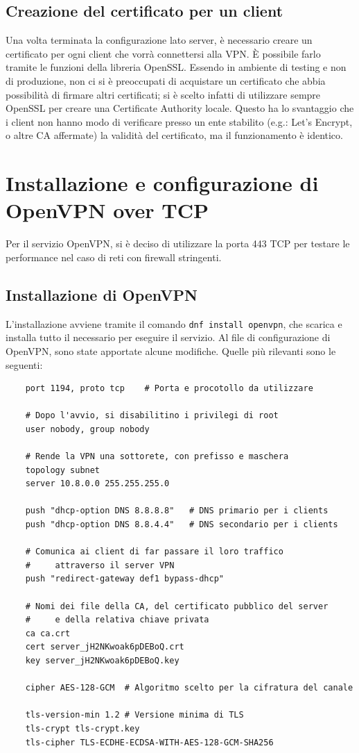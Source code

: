 \subsection{Creazione del certificato per un client}
Una volta terminata la configurazione lato server, è necessario creare un certificato per ogni client che vorrà connettersi alla VPN. È possibile farlo tramite le funzioni della libreria OpenSSL. Essendo in ambiente di testing e non di produzione, non ci si è preoccupati di acquistare un certificato che abbia possibilità di firmare altri certificati; si è scelto infatti di utilizzare sempre OpenSSL per creare una Certificate Authority locale. Questo ha lo svantaggio che i client non hanno modo di verificare presso un ente stabilito (e.g.: Let's Encrypt, o altre CA affermate) la validità del certificato, ma il funzionamento è identico.

\section{Installazione e configurazione di OpenVPN over TCP}
Per il servizio OpenVPN, si è deciso di utilizzare la porta 443 TCP per testare le performance nel caso di reti con firewall stringenti.

\subsection{Installazione di OpenVPN}
L'installazione avviene tramite il comando \texttt{dnf install openvpn}, che scarica e installa tutto il necessario per eseguire il servizio.
Al file di configurazione di OpenVPN, sono state apportate alcune modifiche. Quelle più rilevanti sono le seguenti:

\begin{verbatim}
    port 1194, proto tcp    # Porta e procotollo da utilizzare
    
    # Dopo l'avvio, si disabilitino i privilegi di root
    user nobody, group nobody   

    # Rende la VPN una sottorete, con prefisso e maschera
    topology subnet         
    server 10.8.0.0 255.255.255.0

    push "dhcp-option DNS 8.8.8.8"   # DNS primario per i clients
    push "dhcp-option DNS 8.8.4.4"   # DNS secondario per i clients

    # Comunica ai client di far passare il loro traffico 
    #     attraverso il server VPN
    push "redirect-gateway def1 bypass-dhcp"   

    # Nomi dei file della CA, del certificato pubblico del server 
    #     e della relativa chiave privata
    ca ca.crt
    cert server_jH2NKwoak6pDEBoQ.crt
    key server_jH2NKwoak6pDEBoQ.key
    
    cipher AES-128-GCM  # Algoritmo scelto per la cifratura del canale

    tls-version-min 1.2 # Versione minima di TLS
    tls-crypt tls-crypt.key
    tls-cipher TLS-ECDHE-ECDSA-WITH-AES-128-GCM-SHA256  
\end{verbatim}

